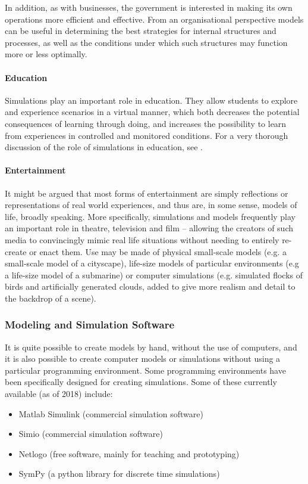 In addition, as with businesses, the government is interested in making its own operations more efficient and effective. From an organisational perspective models can be useful in determining the best strategies for internal structures and processes, as well as the conditions under which such structures may function more or less optimally.
\vfill\newpage\noindent
\paragraph{Education} Simulations play an important role in education. They allow students to explore and experience scenarios in a virtual manner, which both decreases the potential consequences of learning through doing, and increases the possibility to learn from experiences in controlled and monitored conditions. For a very thorough discussion of the role of simulations in education, see \cite{SIM_L}.


\paragraph{Entertainment} It might be argued that most forms of entertainment are simply reflections or representations of real world experiences, and thus are, in some sense, models of life, broadly speaking. More specifically, simulations and models frequently play an important role in theatre, television and film -- allowing the creators of such media to convincingly mimic real life situations without needing to entirely re-create or enact them. Use may be made of physical small-scale models (e.g. a small-scale model of a cityscape), life-size models of particular environments (e.g a life-size model of a submarine) or computer simulations (e.g. simulated flocks of birds and artificially generated clouds, added to give more realism and detail to the backdrop of a scene).

\subsubsection{Modeling and Simulation Software}

It is quite possible to create models by hand, without the use of computers, and it is also possible to create computer models or simulations without using a particular programming environment. Some programming environments have been specifically designed for creating simulations. Some of these currently available (as of 2018) include:

\begin{itemize}[noitemsep]
    \item Matlab Simulink (commercial simulation software)
    \item Simio (commercial simulation software)
    \item Netlogo (free software, mainly for teaching and prototyping)
    \item SymPy (a python library for discrete time simulations)
\end{itemize}

